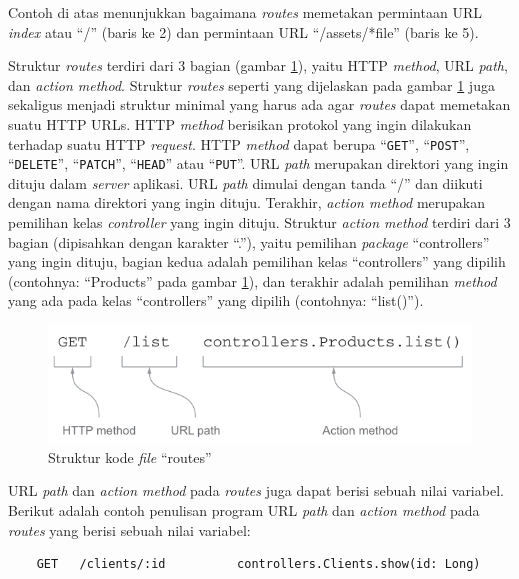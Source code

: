 \documentclass[a4paper,twoside]{article}
\begin{document}
\begin{enumerate}
\begin{itemize}
Contoh di atas menunjukkan bagaimana \textit{routes} memetakan permintaan URL \textit{index} atau ``/'' (baris ke 2) dan permintaan URL ``/assets/*file'' (baris ke 5).

Struktur \textit{routes} terdiri dari 3 bagian (gambar \ref{fig:2_routes}), yaitu HTTP \textit{method}, URL \textit{path}, dan \textit{action method}. Struktur \textit{routes} seperti yang dijelaskan pada gambar \ref{fig:2_routes} juga sekaligus menjadi struktur minimal yang harus ada agar \textit{routes} dapat memetakan suatu HTTP URLs. HTTP \textit{method} berisikan protokol yang ingin dilakukan terhadap suatu HTTP \textit{request}. HTTP \textit{method} dapat berupa ``\texttt{GET}'', ``\texttt{POST}'', ``\texttt{DELETE}'', ``\texttt{PATCH}'', ``\texttt{HEAD}'' atau ``\texttt{PUT}''\cite{playframeworkweb}. URL \textit{path} merupakan direktori yang ingin dituju dalam \textit{server} aplikasi. URL \textit{path} dimulai dengan tanda ``/'' dan diikuti dengan nama direktori yang ingin dituju. Terakhir, \textit{action method} merupakan pemilihan kelas \textit{controller} yang ingin dituju. Struktur \textit{action method} terdiri dari 3 bagian (dipisahkan dengan karakter ``.''), yaitu pemilihan \textit{package} ``controllers'' yang ingin dituju, bagian kedua adalah pemilihan kelas ``controllers'' yang dipilih (contohnya: ``Products'' pada gambar \ref{fig:2_routes}), dan terakhir adalah pemilihan \textit{method} yang ada pada kelas ``controllers'' yang dipilih (contohnya: ``list()'').

\begin{figure}[htbp]
	\centering
		\includegraphics[scale=0.8]{Gambar/2_routes.PNG}
	\caption{Struktur kode \textit{file} ``routes''\cite{playforjava}}
	\label{fig:2_routes}
\end{figure}

URL \textit{path} dan \textit{action method} pada \textit{routes} juga dapat berisi sebuah nilai variabel. Berikut adalah contoh penulisan program URL \textit{path} dan \textit{action method} pada \textit{routes} yang berisi sebuah nilai variabel:

\begin{lstlisting}
	GET   /clients/:id          controllers.Clients.show(id: Long)
\end{lstlisting}


\end{itemize}
\end{enumerate}
\end{document}
